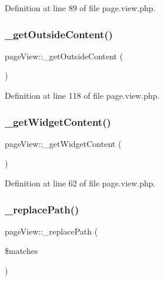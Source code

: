 Definition at line 89 of file page.\+view.\+php.

\mbox{\label{classpageView_aa8045c86496ebdaa32c18e648be079f3}} 
\subsubsection{\texorpdfstring{\+\_\+get\+Outside\+Content()}{\_getOutsideContent()}}
{\footnotesize\ttfamily page\+View\+::\+\_\+get\+Outside\+Content (\begin{DoxyParamCaption}{ }\end{DoxyParamCaption})}



Definition at line 118 of file page.\+view.\+php.

\mbox{\label{classpageView_a5f10c6cf83c7e65e3359423211ead3d8}} 
\subsubsection{\texorpdfstring{\+\_\+get\+Widget\+Content()}{\_getWidgetContent()}}
{\footnotesize\ttfamily page\+View\+::\+\_\+get\+Widget\+Content (\begin{DoxyParamCaption}{ }\end{DoxyParamCaption})}



Definition at line 62 of file page.\+view.\+php.

\mbox{\label{classpageView_a271e9a47148d838689894366475cefd2}} 
\subsubsection{\texorpdfstring{\+\_\+replace\+Path()}{\_replacePath()}}
{\footnotesize\ttfamily page\+View\+::\+\_\+replace\+Path (\begin{DoxyParamCaption}\item[{}]{\$matches }\end{DoxyParamCaption})}



